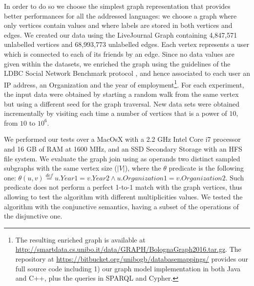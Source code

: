 \label{sec:data} In order to do so we choose the simplest graph representation that
provides better performances for all the addressed languages: we choose a graph where
only vertices contain values and where labels are stored in both vertices and edges.
We created our data using the LiveJournal Graph \cite{dataSIOC} containing 4,847,571
unlabelled vertices and 68,993,773 unlabelled edges. Each vertex represents a user
which is connected to each of its friends by an edge. Since no data values are given
within the datasets, we enriched the graph using the guidelines of the
LDBC Social Network Benchmark protocol \cite{Erling}, and hence associated to each user
an IP address, an Organization and the year of employment\footnote{The resulting enriched
	graph is available at \url{http://smartdata.cs.unibo.it/data/GRAPH/BolognaGraph2016.tar.gz}. The repository at \url{https://bitbucket.org/unibogb/databasemappings/} provides
	our full source code including 1) our graph model implementation in both Java and C++,
	plus the queries in SPARQL and Cypher.}.
For each experiment, the input data were obtained by starting a random walk from the same vertex
but using a different seed for the graph traversal. New data sets were obtained incrementally
by visiting each time a number of vertices that is a power of $10$, from $10$ to $10^6$.


We performed our tests over a MacOsX with
a 2.2 GHz Intel Core i7 processor and 16 GB of RAM at 1600 MHz, and an SSD Secondary Storage with an HFS file system.
We evaluate the graph join using as operands two distinct sampled subgraphs with the same vertex size ($|V|$), where the
$\theta$ predicate is the following one: $\theta(u,v)\overset{def}{=}u.Year1 = v.Year2\wedge u.Organization1 = v.Organization2$. Such predicate does not perform a perfect 1-to-1 match with the graph vertices, thus
allowing to test the algorithm with different multiplicities values.
We tested the algorithm with the conjunctive semantics, having
a subset of the operations of the disjunctive one.

